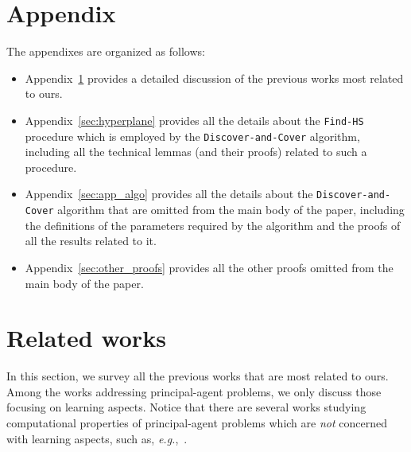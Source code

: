 \section*{Appendix}

The appendixes are organized as follows:
\begin{itemize}
	\item Appendix~\ref{sec:related} provides a detailed discussion of the previous works most related to ours.
	\item Appendix~\ref{sec:hyperplane} provides all the details about  the \texttt{Find-HS} procedure which is employed by the \texttt{Discover-and-Cover} algorithm, including all the technical lemmas (and their proofs) related to such a procedure.
	\item Appendix~\ref{sec:app_algo} provides all the details about the \texttt{Discover-and-Cover} algorithm that are omitted from the main body of the paper, including the definitions of the parameters required by the algorithm and the proofs of all the results related to it.
	\item Appendix~\ref{sec:other_proofs} provides all the other proofs omitted from the main body of the paper.
\end{itemize}

\section{Related works}\label{sec:related}

In this section, we survey all the previous works that are most related to ours.
%
Among the works addressing principal-agent problems, we only discuss those focusing on learning aspects.
%
Notice that there are several works studying computational properties of principal-agent problems  which are \emph{not} concerned with learning aspects, such as, \emph{e.g.},~\citep{dutting2019simple,alon2021contracts,guruganesh2021contracts,dutting2021complexity,dutting2022combinatorial,castiglioni2022bayesian,castiglioni2023multi}.




